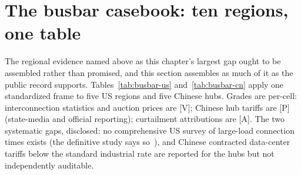 \section{The busbar casebook: ten regions, one table}
\label{sec:busbar-casebook}

The regional evidence named above as this chapter's largest gap ought to be assembled rather than promised, and this section assembles as much of it as the public record supports. Tables~\ref{tab:busbar-us} and~\ref{tab:busbar-cn} apply one standardized frame to five US regions and five Chinese hubs. Grades are per-cell: interconnection statistics and auction prices are [V]; Chinese hub tariffs are [P] (state-media and official reporting); curtailment attributions are [A]. The two systematic gaps, disclosed: no comprehensive US survey of large-load connection times exists (the definitive study says so~\cite{lbl-speed}), and Chinese contracted data-center tariffs below the standard industrial rate are reported for the hubs but not independently auditable.

